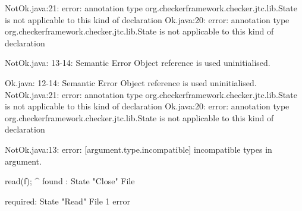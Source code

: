 \lstset{language=,caption=Mungo's output}
\begin{code}
NotOk.java:21: error: annotation type org.checkerframework.checker.jtc.lib.State is not applicable to this kind of declaration
Ok.java:20: error: annotation type org.checkerframework.checker.jtc.lib.State is not applicable to this kind of declaration

NotOk.java: 13-14: Semantic Error
		Object reference is used uninitialised.

Ok.java: 12-14: Semantic Error
		Object reference is used uninitialised.
NotOk.java:21: error: annotation type org.checkerframework.checker.jtc.lib.State is not applicable to this kind of declaration
Ok.java:20: error: annotation type org.checkerframework.checker.jtc.lib.State is not applicable to this kind of declaration
\end{code}

\lstset{language=,caption=Our tool's output}
\begin{code}
NotOk.java:13: error: [argument.type.incompatible] incompatible types in argument.

        read(f);
             ^
  found   : State "Close" File

  required: State "Read" File
1 error
\end{code}

